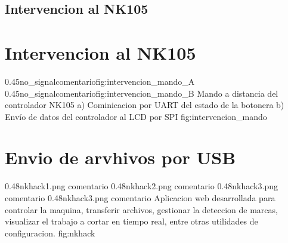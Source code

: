 \subsection{Intervencion al NK105}

\section{Intervencion al NK105}

\subfigab
   {0.45}{no_signal}{comentario}{fig:intervencion_mando_A}
   {0.45}{no_signal}{comentario}{fig:intervencion_mando_B}
         {Mando a distancia del controlador NK105 a) Cominicacion por UART del estado de la botonera b) Envío de datos del controlador al LCD por SPI}
         {fig:intervencion_mando}


\section{Envio de arvhivos por USB}

\subfigtwotwo
         {0.48}{nkhack1.png} {comentario}
         {0.48}{nkhack2.png} {comentario}
         {0.48}{nkhack3.png} {comentario}
         {0.48}{nkhack3.png} {comentario}
         {Aplicacion web desarrollada para controlar la maquina, transferir archivos, gestionar la deteccion de marcas, visualizar el trabajo a cortar en tiempo real, entre otras utilidades de configuracion.}
         {fig:nkhack}
